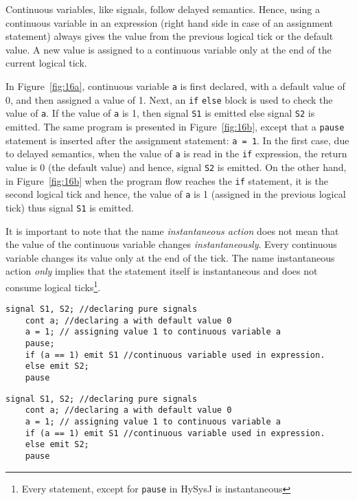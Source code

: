 \documentclass[10pt,journal,cspaper,compsoc]{IEEEtran}
\begin{document}
Continuous variables, like signals, follow delayed semantics. Hence,
using a continuous variable in an expression (right hand side in case of
an assignment statement) always gives the value from the previous
logical tick or the default value. A new value is assigned to a
continuous variable only at the end of the current logical tick. 

In Figure~\ref{fig:16a}, continuous variable \texttt{a} is first
declared, with a default value of 0, and then assigned a value of
1. Next, an \texttt{if} \texttt{else} block is used to check the value
of \texttt{a}. If the value of \texttt{a} is 1, then signal \texttt{S1}
is emitted else signal \texttt{S2} is emitted. The same program is
presented in Figure~\ref{fig:16b}, except that a \texttt{pause}
statement is inserted after the assignment statement: \texttt{a = 1}.
In the first case, due to delayed semantics, when the value of
\texttt{a} is read in the \texttt{if} expression, the return value is 0
(the default value) and hence, signal \texttt{S2} is emitted. On the
other hand, in Figure~\ref{fig:16b} when the program flow reaches the
\texttt{if} statement, it is the second logical tick and hence, the
value of \texttt{a} is 1 (assigned in the previous logical tick) thus
signal \texttt{S1} is emitted.

It is important to note that the name \textit{instantaneous action} does
not mean that the value of the continuous variable changes
\textit{instantaneously}. Every continuous variable changes its value
only at the end of the tick. The name instantaneous action \textit{only}
implies that the statement itself is instantaneous and does not consume
logical ticks\footnote{Every statement, except for \texttt{pause} in
  HySysJ is instantaneous}.

\newbox{\clfggg}
\begin{lrbox}{\clfggg}
  \begin{lstlisting}[mathescape,style=sysj,morekeywords={until,cont,signal,loop,abort,await,emit,present,trap,pause,exit,delay,suspend}]
    signal S1, S2; //declaring pure signals
    cont a; //declaring a with default value 0
    a = 1; // assigning value 1 to continuous variable a
    pause;
    if (a == 1) emit S1 //continuous variable used in expression.
    else emit S2;
    pause
  \end{lstlisting}
\end{lrbox}

\newbox{\clfgg}
\begin{lrbox}{\clfgg}
  \begin{lstlisting}[mathescape,style=sysj,morekeywords={until,cont,signal,loop,abort,await,emit,present,trap,pause,exit,delay,suspend}]
    signal S1, S2; //declaring pure signals
    cont a; //declaring a with default value 0
    a = 1; // assigning value 1 to continuous variable a
    if (a == 1) emit S1 //continuous variable used in expression.
    else emit S2;
    pause
  \end{lstlisting}
\end{lrbox}
\end{document}

